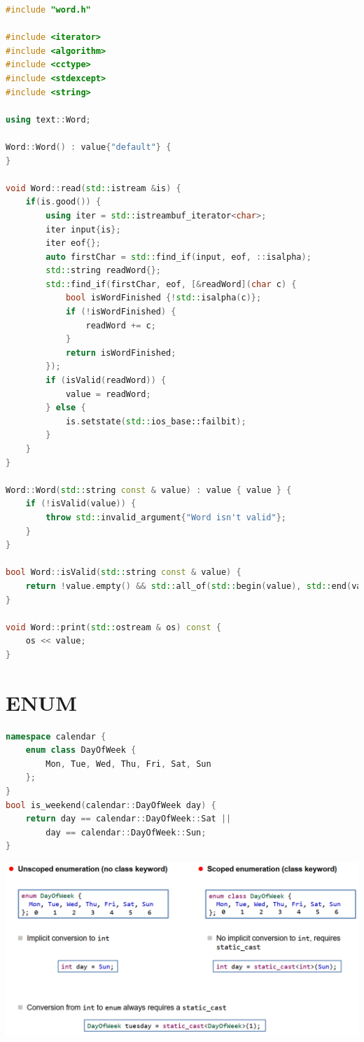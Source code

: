 \begin{lstlisting}[language=C++]
#include "word.h"

#include <iterator>
#include <algorithm>
#include <cctype>
#include <stdexcept>
#include <string>

using text::Word;

Word::Word() : value{"default"} {
}

void Word::read(std::istream &is) {
	if(is.good()) {
		using iter = std::istreambuf_iterator<char>;
		iter input{is};
		iter eof{};
		auto firstChar = std::find_if(input, eof, ::isalpha);
		std::string readWord{};
		std::find_if(firstChar, eof, [&readWord](char c) {
			bool isWordFinished {!std::isalpha(c)};
			if (!isWordFinished) {
				readWord += c;
			}
			return isWordFinished;
		});
		if (isValid(readWord)) {
			value = readWord;
		} else {
			is.setstate(std::ios_base::failbit);
		}
	}
}

Word::Word(std::string const & value) : value { value } {
	if (!isValid(value)) {
		throw std::invalid_argument{"Word isn't valid"};
	}
}

bool Word::isValid(std::string const & value) {
	return !value.empty() && std::all_of(std::begin(value), std::end(value), ::isalpha);
}

void Word::print(std::ostream & os) const {
	os << value;
}
\end{lstlisting}

\section{ENUM}
\begin{lstlisting}[language=C++]
namespace calendar {
    enum class DayOfWeek {
        Mon, Tue, Wed, Thu, Fri, Sat, Sun
    };
}
bool is_weekend(calendar::DayOfWeek day) {
    return day == calendar::DayOfWeek::Sat ||
        day == calendar::DayOfWeek::Sun;
}
\end{lstlisting}

\includegraphics[width=0.9\linewidth]{images/enum.png}
